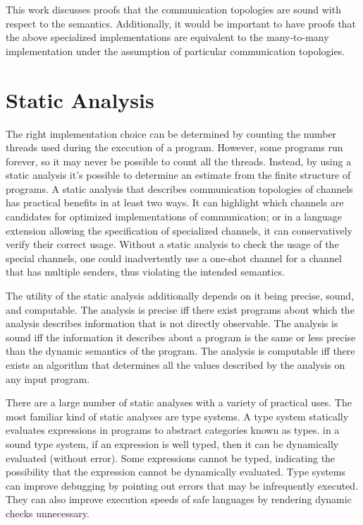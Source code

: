\documentclass{article}
\begin{document}
This work discusses proofs that the communication topologies are sound with respect to the
semantics. Additionally, it would be important to have proofs that the above specialized
implementations are equivalent to the many-to-many implementation under the assumption of
particular communication topologies.

\section{Static Analysis}
The right implementation choice can be determined by counting the number threads used during
the execution of a program. However, some programs run forever, so it may never be possible to
count all the threads. Instead, by using a static analysis it's possible to determine an
estimate from the finite structure of programs. A static analysis that describes communication
topologies of channels has practical benefits in at least two ways.  It can highlight which
channels are candidates for optimized implementations of communication; or in a language
extension allowing the specification of specialized channels, it can conservatively verify
their correct usage. Without a static analysis to check the usage of the special channels, one
could inadvertently use a one-shot channel for a channel that has multiple senders, thus
violating the intended semantics. 

The utility of the static analysis additionally depends on it being precise, sound, and
computable. The analysis is precise iff there exist programs about which the analysis
describes information that is not directly observable. The analysis is sound iff the
information it describes about a program is the same or less precise than the dynamic
semantics of the program. The analysis is computable iff there exists an algorithm that
determines all the values described by the analysis on any input program.

There are a large number of static analyses with a variety of practical uses. The most familiar
kind of static analyses are type systems.  A type system statically evaluates expressions
in programs to abstract categories known as types. in a sound type system, if an expression is
well typed, then it can be dynamically evaluated (without error). Some expressions cannot be
typed, indicating the possibility that the expression cannot be dynamically evaluated. Type
systems can improve debugging by pointing out errors that may be infrequently executed. They
can also improve execution speeds of safe languages by rendering dynamic checks unnecessary.  
\end{document}
